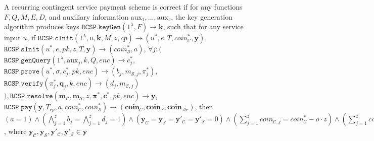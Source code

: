 \begin{definition}[RC-S-P Correctness] A recurring contingent service payment  scheme  is  correct   if for any functions $F, Q, M, E, D$, and auxiliary information $\text{aux}_{\scriptscriptstyle 1},...,\text{aux}_{\scriptscriptstyle z}$, the key generation algorithm produces keys $\mathtt{RCSP}.\mathtt{keyGen}(1^\lambda,F)\rightarrow \bm{k}$,   such that for any service input $u$, if $\mathtt{RCSP}.\mathtt{cInit}(1^\lambda, u,\bm{k}, M,z,cp) \rightarrow (u^{\scriptscriptstyle *}, e, T, coin^{\scriptscriptstyle*}_{\scriptscriptstyle\mathcal C},\bm{y})$, $\mathtt{RCSP}.\mathtt{sInit} (u^{\scriptscriptstyle *}, e, pk, z, T,\bm{y})\rightarrow (coin^{\scriptscriptstyle *}_{\scriptscriptstyle\mathcal S}, a)$,   $\forall j:\Big($$\mathtt{RCSP}.\mathtt{genQuery}(1^{\lambda}, \text{aux}_{\scriptscriptstyle j}, k, Q,  enc)\rightarrow c^{\scriptscriptstyle *}_{\scriptscriptstyle j}$, $\mathtt{RCSP}.\mathtt{prove}(u^{\scriptscriptstyle *},  \sigma, c^{\scriptscriptstyle *}_{\scriptscriptstyle j}, pk,  enc)\rightarrow (b_{\scriptscriptstyle j},m_{\scriptscriptstyle\mathcal {S},j},\pi^{\scriptscriptstyle *}_{\scriptscriptstyle j})$, \\$\mathtt{RCSP}.\mathtt{verify}(\pi^{\scriptscriptstyle *}_{\scriptscriptstyle j}, \bm{q}_{\scriptscriptstyle j},k,enc)\rightarrow (d_{\scriptscriptstyle j}, m_{\scriptscriptstyle\mathcal {C},j})$$\Big), \mathtt{RCSP}.\mathtt{resolve}(\bm{m}_{\scriptscriptstyle \mathcal{C}},\bm{m}_{\scriptscriptstyle \mathcal{S}},z, {\bm{\pi}}^{\scriptscriptstyle *}, {\bm{c}}^{\scriptscriptstyle *},pk,enc)\rightarrow \bm{y}$, \\$\mathtt{RCSP}.\mathtt{pay}(\bm{y},T_{\scriptscriptstyle cp},a,coin^{\scriptscriptstyle *}_{\scriptscriptstyle\mathcal C},coin^{\scriptscriptstyle *}_{\scriptscriptstyle\mathcal S})\rightarrow (\bm{coin}_{\scriptscriptstyle\mathcal C},\bm{coin}_{\scriptscriptstyle\mathcal S},\bm{coin}_{\scriptscriptstyle\mathcal Ar})$, then $(a=1)\wedge (\bigwedge\limits^{\scriptscriptstyle z}_{\scriptscriptstyle j=1} b_{\scriptscriptstyle j}= \bigwedge\limits^{\scriptscriptstyle z}_{\scriptscriptstyle j=1} d_{\scriptscriptstyle j}=1)\wedge (\bm{y}_{\scriptscriptstyle \mathcal C}=\bm{y}_{\scriptscriptstyle \mathcal S}=\bm{y}'_{\scriptscriptstyle \mathcal C}=\bm{y}'_{\scriptscriptstyle \mathcal S}=0) \wedge (\sum\limits^{\scriptscriptstyle z}_{\scriptscriptstyle j=1}coin_{\scriptscriptstyle\mathcal C,j}=coin^{\scriptscriptstyle *}_{\scriptscriptstyle\mathcal C}-o\cdot z) \wedge  (\sum\limits^{\scriptscriptstyle z}_{\scriptscriptstyle j=1}coin_{\scriptscriptstyle\mathcal S,j}=coin^{\scriptscriptstyle *}_{\scriptscriptstyle\mathcal S}+o\cdot z)  \wedge (\sum\limits^{\scriptscriptstyle z}_{\scriptscriptstyle j=1}coin_{\scriptscriptstyle\mathcal Ar,j}=0)$, where $\bm{y}_{\scriptscriptstyle \mathcal C},\bm{y}_{\scriptscriptstyle \mathcal S},\bm{y}'_{\scriptscriptstyle \mathcal C},\bm{y}'_{\scriptscriptstyle \mathcal S}\in \bm{y}$
\end{definition}

